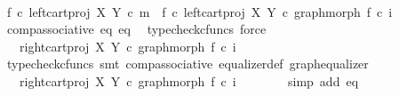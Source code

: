 \begin{isabellebody}
\ \ \isamarkupfalse%
\ {\isacharminus}{\kern0pt}\ \isanewline
\ \ \ \ \isamarkupfalse%
\ {\isachardoublequoteopen}f{}\ {\isasymcirc}\isactrlsub c\ left{\isacharunderscore}{\kern0pt}cart{\isacharunderscore}{\kern0pt}proj\ X\ Y\ {\isasymcirc}\isactrlsub c\ m\ {\isacharequal}{\kern0pt}\ {\isacharparenleft}{\kern0pt}f{}\ {\isasymcirc}\isactrlsub c\ left{\isacharunderscore}{\kern0pt}cart{\isacharunderscore}{\kern0pt}proj\ X\ Y{\isacharparenright}{\kern0pt}\ {\isasymcirc}\isactrlsub c\ graph{\isacharunderscore}{\kern0pt}morph\ f{}\ {\isasymcirc}\isactrlsub c\ i{}{\isachardoublequoteclose}\isanewline
\ \ \ \ \ \ \isamarkupfalse%
\ comp{\isacharunderscore}{\kern0pt}associative{}\ eq{}\ eq{}\ \isamarkupfalse%
\ {\isacharparenleft}{\kern0pt}typecheck{\isacharunderscore}{\kern0pt}cfuncs{\isacharcomma}{\kern0pt}\ force{\isacharparenright}{\kern0pt}\isanewline
\ \ \ \ \isamarkupfalse%
\ \isamarkupfalse%
\ {\isachardoublequoteopen}{\isachardot}{\kern0pt}{\isachardot}{\kern0pt}{\isachardot}{\kern0pt}\ {\isacharequal}{\kern0pt}\ {\isacharparenleft}{\kern0pt}right{\isacharunderscore}{\kern0pt}cart{\isacharunderscore}{\kern0pt}proj\ X\ Y{\isacharparenright}{\kern0pt}\ {\isasymcirc}\isactrlsub c\ graph{\isacharunderscore}{\kern0pt}morph\ f{}\ {\isasymcirc}\isactrlsub c\ i{}{\isachardoublequoteclose}\isanewline
\ \ \ \ \ \ \isamarkupfalse%
\ {\isacharparenleft}{\kern0pt}typecheck{\isacharunderscore}{\kern0pt}cfuncs{\isacharcomma}{\kern0pt}\ smt\ comp{\isacharunderscore}{\kern0pt}associative{}\ equalizer{\isacharunderscore}{\kern0pt}def\ graph{\isacharunderscore}{\kern0pt}equalizer{}{\isacharparenright}{\kern0pt}\isanewline
\ \ \ \ \isamarkupfalse%
\ \isamarkupfalse%
\ {\isachardoublequoteopen}{\isachardot}{\kern0pt}{\isachardot}{\kern0pt}{\isachardot}{\kern0pt}\ {\isacharequal}{\kern0pt}\ {\isacharparenleft}{\kern0pt}right{\isacharunderscore}{\kern0pt}cart{\isacharunderscore}{\kern0pt}proj\ X\ Y{\isacharparenright}{\kern0pt}\ {\isasymcirc}\isactrlsub c\ graph{\isacharunderscore}{\kern0pt}morph\ f{}\ {\isasymcirc}\isactrlsub c\ i{}{\isachardoublequoteclose}\isanewline
\ \ \ \ \ \ \isamarkupfalse%
\ {\isacharparenleft}{\kern0pt}simp\ add{\isacharcolon}{\kern0pt}\ eq{}{\isacharparenright}{\kern0pt}\isanewline
\ \ \ \ \isamarkupfalse%

\end{isabellebody}

